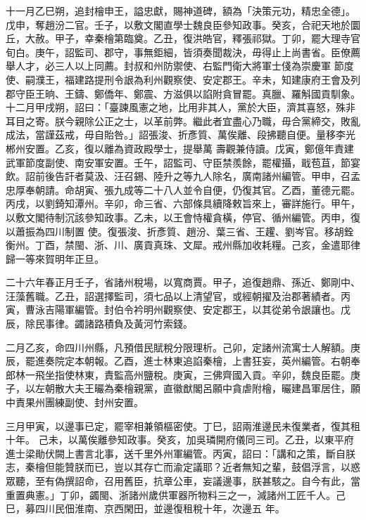 \begin{pinyinscope}
 十一月乙巳朔，追封檜申王，謚忠獻，賜神道碑，額為「決策元功，精忠全德」。戊申，奪趙汾二官。壬子，以敷文閣直學士魏良臣參知政事。癸亥，合祀天地於圜丘，大赦。甲子，幸秦檜第臨奠。乙丑，復洪皓官，釋張祁獄。丁卯，罷大理寺官旬白。庚午，詔監司、郡守，事無鉅細，皆須奏聞裁決，毋得止上尚書省。臣僚薦舉人才，必三人以上同薦。封叔和州防禦使、右監門衛大將軍士俴為崇慶軍
 節度使、嗣濮王，福建路提刑令詪為利州觀察使、安定郡王。辛未，知建康府王會及列郡守臣王晌、王鑄、鄭僑年、鄭震、方滋俱以諂附貪冒罷。真臘、羅斛國貢馴象。十二月甲戌朔，詔曰：「臺諫風憲之地，比用非其人，黨於大臣，濟其喜怒，殊非耳目之寄。朕今親除公正之士，以革前弊。繼此者宜盡心乃職，毋合黨締交，敗亂成法，當謹茲戒，毋自貽咎。」詔張浚、折彥質、萬俟離、段拂聽自便。量移李光郴州安置。乙亥，復以離為資政殿學士，提舉萬
 壽觀兼侍讀。戊寅，鄭億年責建武軍節度副使、南安軍安置。壬午，詔監司、守臣禁羨餘，罷權攝，戢苞苴，節宴飲。詔前後告訐者莫汲、汪召錫、陸升之等九人除名，廣南諸州編管。甲申，召孟忠厚奉朝請。命胡寅、張九成等二十八人並令自便，仍復其官。乙酉，董德元罷。丙戌，以劉錡知潭州。辛卯，命三省、六部條具續降敕旨來上，審詳施行。甲午，以敷文閣待制沉該參知政事。乙未，以王會恃權貪橫，停官、循州編管。丙申，復以蕭振為四川制置
 使。復張浚、折彥質、趙汾、葉三省、王趯、劉岑官。移胡銓衡州。丁酉，禁閩、浙、川、廣貢真珠、文犀。戒州縣加收耗糧。己亥，金遣耶律歸一等來賀明年正旦。



 二十六年春正月壬子，省諸州稅場，以寬商賈。甲子，追復趙鼎、孫近、鄭剛中、汪藻舊職。乙丑，詔選擇監司，須七品以上清望官，或經朝擢及治郡著績者。丙寅，曹泳吉陽軍編管。封伯令衿明州觀察使、安定郡王，以其從弟令詪讓也。戊辰，除民事律。蠲諸路積負及黃河竹索錢。



 二月乙亥，命四川州縣，凡預借民賦稅分限理析。己卯，定諸州流寓士人解額。庚辰，罷進奏院定本朝報。乙酉，進士林東追諂秦檜，上書狂妄，英州編管。右朝奉郎林一飛坐指使林東，責監高州鹽稅。庚寅，三佛齊國入貢。辛卯，魏良臣罷。庚子，以左朝散大夫王曮為秦檜親黨，直徽猷閣呂願中貪虐附檜，曮建昌軍居住，願中責果州團練副使、封州安置。



 三月甲寅，以邊事已定，罷宰相兼領樞密使。丁巳，詔兩淮邊民未復業者，復其租十年。
 己未，以萬俟離參知政事。癸亥，加吳璘開府儀同三司。乙丑，以東平府進士梁勛伏闕上書言北事，送千里外州軍編管。丙寅，詔曰：「講和之策，斷自朕志，秦檜但能贊朕而已，豈以其存亡而渝定議耶？近者無知之輩，鼓倡浮言，以惑眾聽，至有偽撰詔命，召用舊臣，抗章公車，妄議邊事，朕甚駭之。自今有此，當重置典憲。」丁卯，蠲閩、浙諸州歲供軍器所物料三之一，減諸州工匠千人。己巳，募四川民佃淮南、京西閑田，並邊復租稅十年，次邊五
 年。




\end{pinyinscope}
